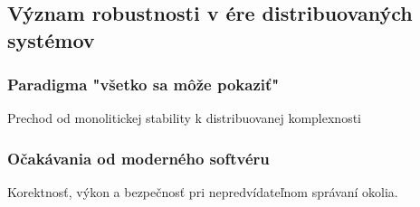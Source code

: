 \documentclass[../../../thesis.tex]{subfiles}
\begin{document}
    \subsection{Význam robustnosti v ére distribuovaných systémov}

    \subsubsection*{Paradigma "všetko sa môže pokaziť"}
    Prechod od monolitickej stability k distribuovanej komplexnosti

    \subsubsection*{Očakávania od moderného softvéru}
    Korektnosť, výkon a bezpečnosť pri nepredvídateľnom správaní okolia.
\end{document}
